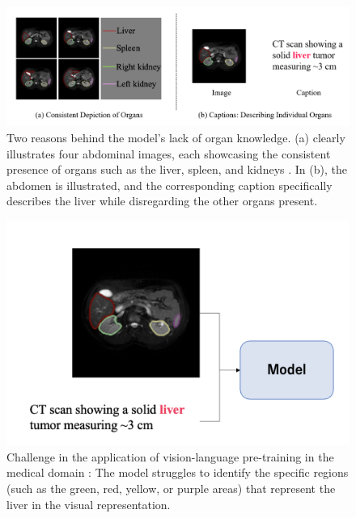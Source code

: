 \begin{figure}[t]
\begin{center}
\includegraphics[width=1.0\linewidth]{Chapter_3/chap3_reasonOfProblem.png}
\end{center}
   \caption{Two reasons behind the model's lack of organ knowledge. (a) clearly illustrates four abdominal images, each showcasing the consistent presence of organs such as the liver, spleen, and kidneys \cite{chen2022c}. In (b), the abdomen is illustrated, and the corresponding caption specifically describes the liver while disregarding the other organs present.
}
\label{fig:reasonsOfProblem}
\end{figure}

\begin{figure}[t]
\begin{center}
\includegraphics[width=1.0\linewidth]{Chapter_3/chap3_problem.png}
\end{center}
   \caption{Challenge in the application of vision-language pre-training in the medical domain \cite{chen2022c}: The model struggles to identify the specific regions (such as the green, red, yellow, or purple areas) that represent the liver in the visual representation. 
}
\label{fig:probelm}
\end{figure}


